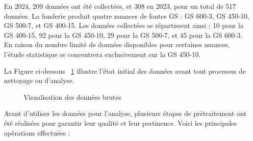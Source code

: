 \documentclass[12pt]{article}
\begin{document}
En 2024, 209 données ont été collectées, et 308 en 2023, pour un total de 
517 données. La fonderie produit quatre nuances de fontes GS : GS 600-3, 
GS 450-10, GS 500-7, et GS 400-15. Les données collectées se répartissent 
ainsi : 10 pour la GS 400-15, 92 pour la GS 450-10, 29 pour la GS 500-7, 
et 45 pour la GS 600-3. En raison du nombre limité de données disponibles 
pour certaines nuances, l'étude statistique se concentrera exclusivement 
sur la GS 450-10.





La Figure ci-dessous ~\ref{fig:donnees_brutes}  illustre l'état initial des données avant tout 
processus de nettoyage ou d'analyse.


\begin{figure}[H]
    \centering
    \caption{Visualisation des données brutes}
    \label{fig:donnees_brutes}
\end{figure}





Avant d'utiliser les données pour l'analyse, plusieurs étapes de 
prétraitement ont été réalisées pour garantir leur qualité et leur 
pertinence. Voici les principales opérations effectuées :
\end{document}
